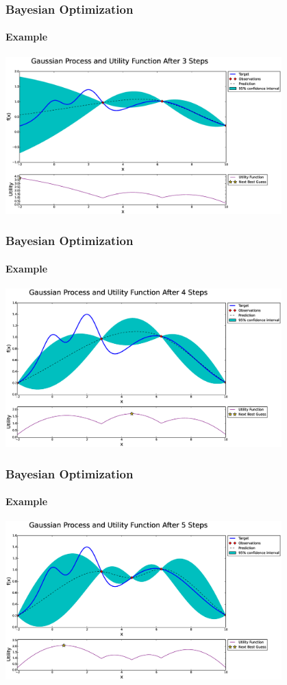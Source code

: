 \begin{frame}
	\frametitle{Bayesian Optimization}
	\framesubtitle{Example}
	
	\centering
	\includegraphics[width=0.8\textwidth]{figures/bayesian-optimization/fig1}
	
\end{frame}

\begin{frame}
	\frametitle{Bayesian Optimization}
	\framesubtitle{Example}
	
	\centering
	\includegraphics[width=0.8\textwidth]{figures/bayesian-optimization/fig2}
	
\end{frame}

\begin{frame}
	\frametitle{Bayesian Optimization}
	\framesubtitle{Example}
	
	\centering
	\includegraphics[width=0.8\textwidth]{figures/bayesian-optimization/fig3}
	
\end{frame}

